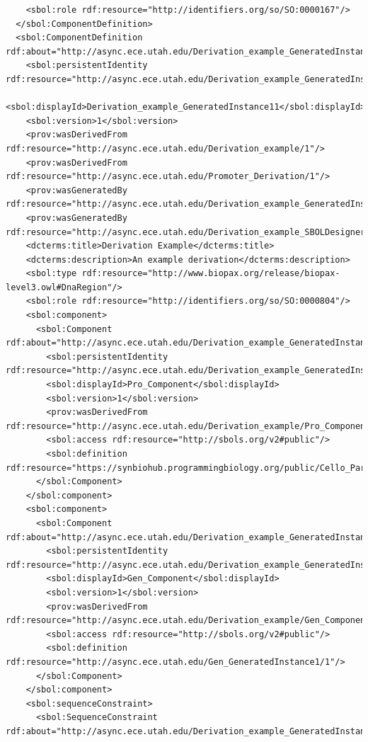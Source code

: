 \begin{lstlisting}
    <sbol:role rdf:resource="http://identifiers.org/so/SO:0000167"/>
  </sbol:ComponentDefinition>
  <sbol:ComponentDefinition rdf:about="http://async.ece.utah.edu/Derivation_example_GeneratedInstance11/1">
    <sbol:persistentIdentity rdf:resource="http://async.ece.utah.edu/Derivation_example_GeneratedInstance11"/>
    <sbol:displayId>Derivation_example_GeneratedInstance11</sbol:displayId>
    <sbol:version>1</sbol:version>
    <prov:wasDerivedFrom rdf:resource="http://async.ece.utah.edu/Derivation_example/1"/>
    <prov:wasDerivedFrom rdf:resource="http://async.ece.utah.edu/Promoter_Derivation/1"/>
    <prov:wasGeneratedBy rdf:resource="http://async.ece.utah.edu/Derivation_example_GeneratedInstance21_SBOLDesignerActivity/1"/>
    <prov:wasGeneratedBy rdf:resource="http://async.ece.utah.edu/Derivation_example_SBOLDesignerActivity/1"/>
    <dcterms:title>Derivation Example</dcterms:title>
    <dcterms:description>An example derivation</dcterms:description>
    <sbol:type rdf:resource="http://www.biopax.org/release/biopax-level3.owl#DnaRegion"/>
    <sbol:role rdf:resource="http://identifiers.org/so/SO:0000804"/>
    <sbol:component>
      <sbol:Component rdf:about="http://async.ece.utah.edu/Derivation_example_GeneratedInstance11/Pro_Component/1">
        <sbol:persistentIdentity rdf:resource="http://async.ece.utah.edu/Derivation_example_GeneratedInstance11/Pro_Component"/>
        <sbol:displayId>Pro_Component</sbol:displayId>
        <sbol:version>1</sbol:version>
        <prov:wasDerivedFrom rdf:resource="http://async.ece.utah.edu/Derivation_example/Pro_Component/1"/>
        <sbol:access rdf:resource="http://sbols.org/v2#public"/>
        <sbol:definition rdf:resource="https://synbiohub.programmingbiology.org/public/Cello_Parts/pAmtR/1"/>
      </sbol:Component>
    </sbol:component>
    <sbol:component>
      <sbol:Component rdf:about="http://async.ece.utah.edu/Derivation_example_GeneratedInstance11/Gen_Component/1">
        <sbol:persistentIdentity rdf:resource="http://async.ece.utah.edu/Derivation_example_GeneratedInstance11/Gen_Component"/>
        <sbol:displayId>Gen_Component</sbol:displayId>
        <sbol:version>1</sbol:version>
        <prov:wasDerivedFrom rdf:resource="http://async.ece.utah.edu/Derivation_example/Gen_Component/1"/>
        <sbol:access rdf:resource="http://sbols.org/v2#public"/>
        <sbol:definition rdf:resource="http://async.ece.utah.edu/Gen_GeneratedInstance1/1"/>
      </sbol:Component>
    </sbol:component>
    <sbol:sequenceConstraint>
      <sbol:SequenceConstraint rdf:about="http://async.ece.utah.edu/Derivation_example_GeneratedInstance11/Derivation_example_SequenceConstraint/1">

\end{lstlisting}
